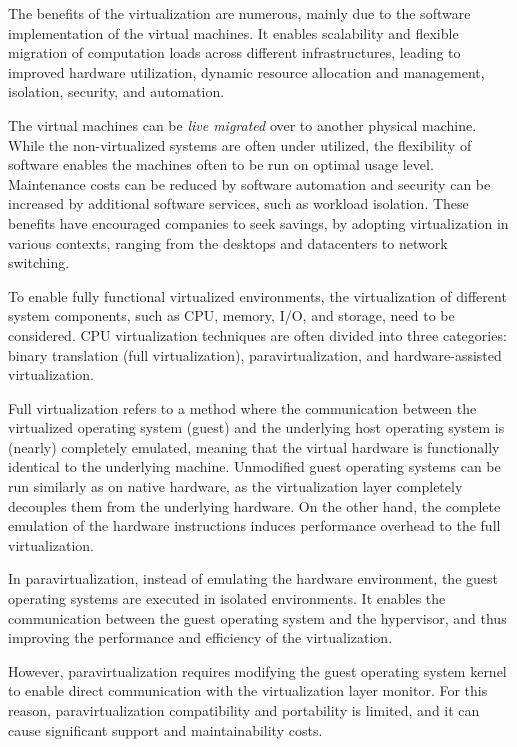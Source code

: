 The benefits of the virtualization are numerous, mainly due to the software implementation of the virtual machines. It enables scalability and flexible migration of computation loads across different infrastructures, leading to improved hardware utilization, dynamic resource allocation and management, isolation, security, and automation.~\cite{Pearce:2013:VIS}

The virtual machines can be \emph{live migrated} over to another physical machine. While the non-virtualized systems are often under utilized, the flexibility of software enables the machines often to be run on optimal usage level. Maintenance costs can be reduced by software automation and security can be increased by additional software services, such as workload isolation. These benefits have encouraged companies to seek savings, by adopting virtualization in various contexts, ranging from the desktops and datacenters to network switching.~\cite{Uhlig:2005:IVT, Pearce:2013:VIS}

To enable fully functional virtualized environments, the virtualization of different system components, such as CPU, memory, I/O, and storage, need to be considered. CPU virtualization techniques are often divided into three categories: binary translation (full virtualization), paravirtualization, and hardware-assisted virtualization.~\cite{Bugnion:2012:BVX, Pearce:2013:VIS, Horne:2007:Understanding}

Full virtualization refers to a method where the communication between the virtualized operating system (guest) and the underlying host operating system is (nearly) completely emulated, meaning that the virtual hardware is functionally identical to the underlying machine. Unmodified guest operating systems can be run similarly as on native hardware, as the virtualization layer completely decouples them from the underlying hardware. On the other hand, the complete emulation of the hardware instructions induces performance overhead to the full virtualization.~\cite{Bugnion:2012:BVX, Barham:2003:XAV, Horne:2007:Understanding}

In paravirtualization, instead of emulating the hardware environment, the guest operating systems are executed in isolated environments. It enables the communication between the guest operating system and the hypervisor, and thus improving the performance and efficiency of the virtualization.~\cite{Barham:2003:XAV, Horne:2007:Understanding}

However, paravirtualization requires modifying the guest operating system kernel to enable direct communication with the virtualization layer monitor. For this reason, paravirtualization compatibility and portability is limited, and it can cause significant support and maintainability costs.~\cite{Barham:2003:XAV, Horne:2007:Understanding}

